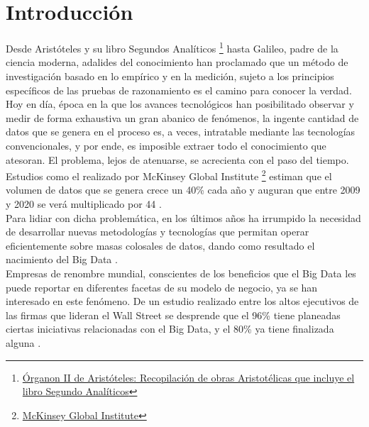 
\pagestyle{fancy}

\chapter{Introducción}
\label{introduccion}

Desde Aristóteles y su libro Segundos Analíticos \footnote{\href{https://docs.google.com/a/datik.es/file/d/0By4kcbi6MzzdUHhVQnUtcTNUdk0/view}{Órganon II de Aristóteles: Recopilación de obras Aristotélicas que incluye el libro Segundo Analíticos}} hasta Galileo, padre de la ciencia moderna, adalides del conocimiento han proclamado que un método de investigación basado en lo empírico y en la medición, sujeto a los principios específicos de las pruebas de razonamiento es el camino para conocer la verdad.\\

Hoy en día, época en la que los avances tecnológicos han posibilitado observar y medir de forma exhaustiva un gran abanico de fenómenos, la ingente cantidad de datos que se genera en el proceso es, a veces, intratable mediante las tecnologías convencionales, y por ende, es imposible extraer todo el conocimiento que atesoran. El problema, lejos de atenuarse, se acrecienta con el paso del tiempo. Estudios como el realizado por McKinsey Global Institute \footnote{\href{http://www.mckinsey.com/mgi/overview}{McKinsey Global Institute}} estiman que el volumen de datos que se genera crece un 40\% cada año y auguran que entre 2009 y 2020 se verá multiplicado por 44 \cite{nambiartowards}.\\

Para lidiar con dicha problemática, en los últimos años ha irrumpido la necesidad de desarrollar nuevas metodologías y tecnologías que permitan operar eficientemente sobre masas colosales de datos, dando como resultado el nacimiento del Big Data \cite{manyika2011big}.\\

Empresas de renombre mundial, conscientes de los beneficios que el Big Data les puede reportar en diferentes facetas de su modelo de negocio, ya se han interesado en este fenómeno. De un estudio realizado entre los altos ejecutivos de las firmas que lideran el Wall Street se desprende que el 96\% tiene planeadas ciertas iniciativas relacionadas con el Big Data, y el 80\% ya tiene finalizada alguna \cite{bdes:2013}. 

